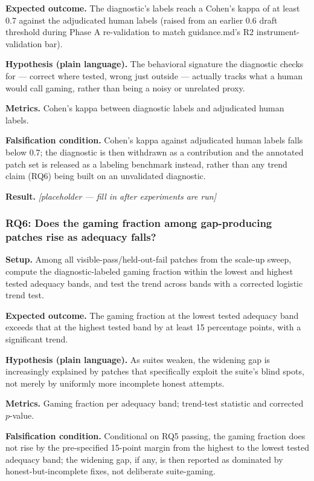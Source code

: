 \documentclass[11pt]{article}
\newcommand{\ph}{\textit{[placeholder --- fill in after experiments are run]}}
\begin{document}
\textbf{Expected outcome.} The diagnostic's labels reach a Cohen's kappa of at least 0.7 against the adjudicated human labels (raised from an earlier 0.6 draft threshold during Phase A re-validation to match guidance.md's R2 instrument-validation bar).

\textbf{Hypothesis (plain language).} The behavioral signature the diagnostic checks for --- correct where tested, wrong just outside --- actually tracks what a human would call gaming, rather than being a noisy or unrelated proxy.

\textbf{Metrics.} Cohen's kappa between diagnostic labels and adjudicated human labels.

\textbf{Falsification condition.} Cohen's kappa against adjudicated human labels falls below 0.7; the diagnostic is then withdrawn as a contribution and the annotated patch set is released as a labeling benchmark instead, rather than any trend claim (RQ6) being built on an unvalidated diagnostic.

\textbf{Result.} \ph

\subsubsection{RQ6: Does the gaming fraction among gap-producing patches rise as adequacy falls?}
\textbf{Setup.} Among all visible-pass/held-out-fail patches from the scale-up sweep, compute the diagnostic-labeled gaming fraction within the lowest and highest tested adequacy bands, and test the trend across bands with a corrected logistic trend test.

\textbf{Expected outcome.} The gaming fraction at the lowest tested adequacy band exceeds that at the highest tested band by at least 15 percentage points, with a significant trend.

\textbf{Hypothesis (plain language).} As suites weaken, the widening gap is increasingly explained by patches that specifically exploit the suite's blind spots, not merely by uniformly more incomplete honest attempts.

\textbf{Metrics.} Gaming fraction per adequacy band; trend-test statistic and corrected $p$-value.

\textbf{Falsification condition.} Conditional on RQ5 passing, the gaming fraction does not rise by the pre-specified 15-point margin from the highest to the lowest tested adequacy band; the widening gap, if any, is then reported as dominated by honest-but-incomplete fixes, not deliberate suite-gaming.
\end{document}
